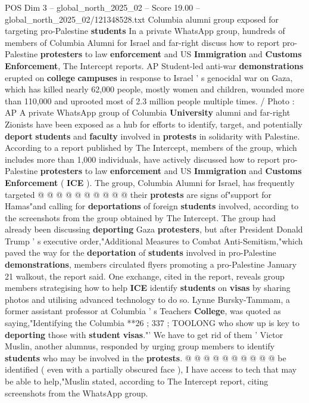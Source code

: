 \begin{textsample}{POS Dim 3 – global\_north\_2025\_02 – Score 19.00 – global\_north\_2025\_02/121348528.txt}  \label{ex:f3_pos_291}
Columbia alumni group exposed for targeting pro-Palestine \textbf{students} In a private WhatsApp group, hundreds of members of Columbia Alumni for Israel and far-right discuss how to report pro-Palestine \textbf{protesters} to law \textbf{enforcement} and US \textbf{Immigration} and \textbf{Customs} \textbf{Enforcement}, The Intercept reports.
AP Student-led anti-war \textbf{demonstrations} erupted on \textbf{college} \textbf{campuses} in response to Israel ' s genocidal war on Gaza, which has killed nearly 62,000 people, mostly women and children, wounded more than 110,000 and uprooted most of 2.3 million people multiple times. / Photo : AP A private WhatsApp group of Columbia \textbf{University} alumni and far-right Zionists have been exposed as a hub for efforts to identify, target, and potentially \textbf{deport} \textbf{students} and \textbf{faculty} involved in \textbf{protests} in solidarity with Palestine.
According to a report published by The Intercept, members of the group, which includes more than 1,000 individuals, have actively discussed how to report pro-Palestine \textbf{protesters} to law \textbf{enforcement} and US \textbf{Immigration} and \textbf{Customs} \textbf{Enforcement} ( \textbf{ICE} ).
The group, Columbia Alumni for Israel, has frequently targeted @ @ @ @ @ @ @ @ @ @ their \textbf{protests} are signs of"support for Hamas"and calling for \textbf{deportations} of foreign \textbf{students} involved, according to the screenshots from the group obtained by The Intercept.
The group had already been discussing \textbf{deporting} Gaza \textbf{protesters}, but after President Donald Trump ' s executive order,"Additional Measures to Combat Anti-Semitism,"which paved the way for the \textbf{deportation} of \textbf{students} involved in pro-Palestine \textbf{demonstrations}, members circulated flyers promoting a pro-Palestine January 21 walkout, the report said.
One exchange, cited in the report, reveals group members strategising how to help \textbf{ICE} identify \textbf{students} on \textbf{visas} by sharing photos and utilising advanced technology to do so.
Lynne Bursky-Tammam, a former assistant professor at Columbia ' s Teachers \textbf{College}, was quoted as saying,"Identifying the Columbia **26 ; 337 ; TOOLONG who show up is key to \textbf{deporting} those with \textbf{student} \textbf{visas}."' We have to get rid of them ' Victor Muslin, another alumnus, responded by urging group members to identify \textbf{students} who may be involved in the \textbf{protests}. @ @ @ @ @ @ @ @ @ @ be identified ( even with a partially obscured face ), I have access to tech that may be able to help,"Muslin stated, according to The Intercept report, citing screenshots from the WhatsApp group.

\end{textsample}
